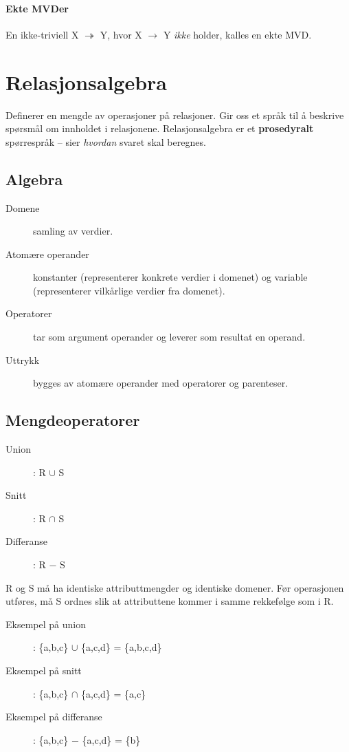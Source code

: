 \documentclass[12pt,a4paper]{article}
\begin{document}
\paragraph{Ekte MVDer}
En ikke-triviell X $\twoheadrightarrow$ Y, hvor X $\rightarrow$ Y \textit{ikke} holder, kalles en ekte MVD.

\section{Relasjonsalgebra}
Definerer en mengde av operasjoner på relasjoner. Gir oss et språk til å beskrive spørsmål om innholdet i relasjonene. Relasjonsalgebra er et \textbf{prosedyralt} spørrespråk -- sier \textit{hvordan} svaret skal beregnes.

\subsection{Algebra}
\begin{description}
\item[Domene] samling av verdier.
\item[Atomære operander] konstanter (representerer konkrete verdier i domenet) og variable (representerer vilkårlige verdier fra domenet).
\item[Operatorer] tar som argument operander og leverer som resultat en operand.
\item[Uttrykk] bygges av atomære operander med operatorer og parenteser.
\end{description}

\subsection{Mengdeoperatorer}
\begin{description}
\item[Union]: R $\cup$ S
\item[Snitt]: R $\cap$ S
\item[Differanse]: R $-$ S
\end{description}

R og S må ha identiske attributtmengder og identiske domener. Før operasjonen utføres, må S ordnes slik at attributtene kommer i samme rekkefølge som i R.

\begin{description}
\item[Eksempel på union]: \{a,b,c\} $\cup$ \{a,c,d\} = \{a,b,c,d\}
\item[Eksempel på snitt]: \{a,b,c\} $\cap$ \{a,c,d\} = \{a,c\}
\item[Eksempel på differanse]: \{a,b,c\} $-$ \{a,c,d\} = \{b\}
\end{description}
\end{document}

